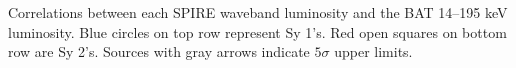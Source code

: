 \label{fig:lum_spire_BAT} Correlations between each SPIRE waveband luminosity and the BAT 14--195 keV luminosity. Blue circles on top row represent Sy 1's. Red open squares on bottom row are Sy 2's. Sources with gray arrows indicate $5\sigma$ upper limits.